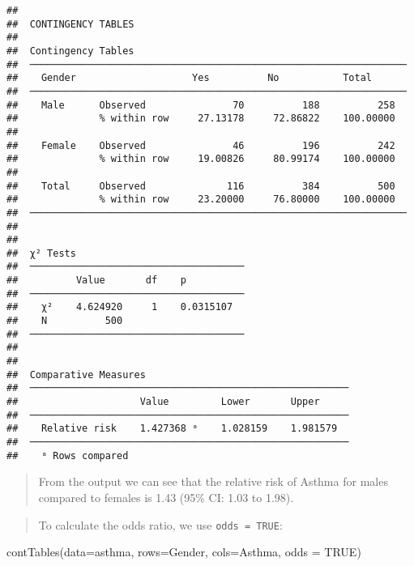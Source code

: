 \documentclass[
]{memoir}
\newenvironment{Shaded}{\begin{snugshade}}{\end{snugshade}}
\newcommand{\AttributeTok}[1]{\textcolor[rgb]{0.77,0.63,0.00}{#1}}
\newcommand{\ConstantTok}[1]{\textcolor[rgb]{0.00,0.00,0.00}{#1}}
\newcommand{\FunctionTok}[1]{\textcolor[rgb]{0.00,0.00,0.00}{#1}}
\newcommand{\NormalTok}[1]{#1}
\begin{document}
\begin{verbatim}
## 
##  CONTINGENCY TABLES
## 
##  Contingency Tables                                                
##  ───────────────────────────────────────────────────────────────── 
##    Gender                    Yes          No           Total       
##  ───────────────────────────────────────────────────────────────── 
##    Male      Observed               70          188          258   
##              % within row     27.13178     72.86822    100.00000   
##                                                                    
##    Female    Observed               46          196          242   
##              % within row     19.00826     80.99174    100.00000   
##                                                                    
##    Total     Observed              116          384          500   
##              % within row     23.20000     76.80000    100.00000   
##  ───────────────────────────────────────────────────────────────── 
## 
## 
##  χ² Tests                              
##  ───────────────────────────────────── 
##          Value       df    p           
##  ───────────────────────────────────── 
##    χ²    4.624920     1    0.0315107   
##    N          500                      
##  ───────────────────────────────────── 
## 
## 
##  Comparative Measures                                    
##  ─────────────────────────────────────────────────────── 
##                     Value         Lower       Upper      
##  ─────────────────────────────────────────────────────── 
##    Relative risk    1.427368 ᵃ    1.028159    1.981579   
##  ─────────────────────────────────────────────────────── 
##    ᵃ Rows compared
\end{verbatim}

\begin{quote}
From the output we can see that the relative risk of Asthma for males compared to females is 1.43 (95\% CI: 1.03 to 1.98).
\end{quote}

\begin{quote}
To calculate the odds ratio, we use \texttt{odds\ =\ TRUE}:
\end{quote}

\begin{Shaded}
\begin{Highlighting}[]
\FunctionTok{contTables}\NormalTok{(}\AttributeTok{data=}\NormalTok{asthma, }\AttributeTok{rows=}\NormalTok{Gender, }\AttributeTok{cols=}\NormalTok{Asthma,}
          \AttributeTok{odds =} \ConstantTok{TRUE}\NormalTok{)}
\end{Highlighting}
\end{Shaded}
\end{document}
